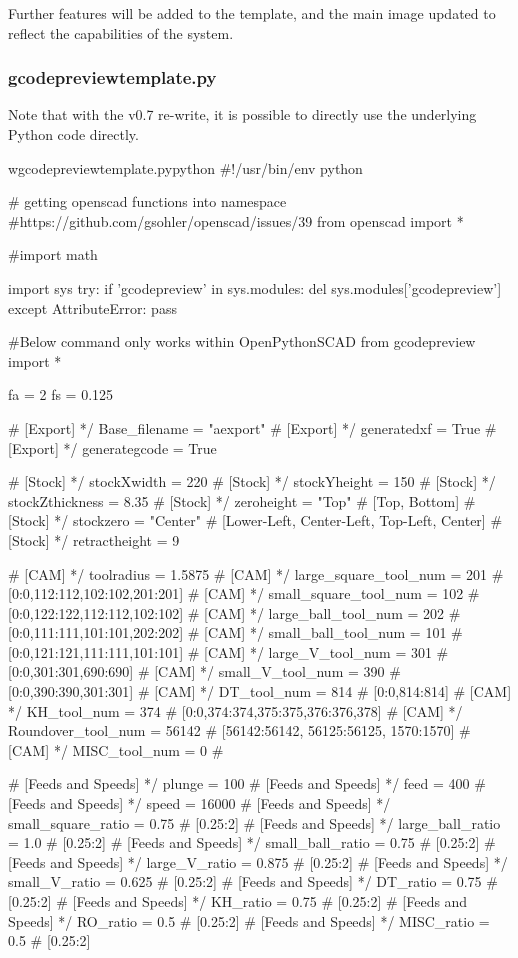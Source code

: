 \documentclass{ltxdoc}
\begin{document}
Further features will be added to the template, and the main image updated to reflect the capabilities of the system.


\subsubsection{gcodepreviewtemplate.py}
           
Note that with the v0.7 re-write, it is possible to directly use the underlying Python code directly.

\lstset{firstnumber=1}%
\begin{writecode}{w}{gcodepreviewtemplate.py}{python}
#!/usr/bin/env python

# getting openscad functions into namespace
#https://github.com/gsohler/openscad/issues/39
from openscad import *

#import math

import sys
try:
    if 'gcodepreview' in sys.modules:
        del sys.modules['gcodepreview']
except AttributeError:
    pass

#Below command only works within OpenPythonSCAD
from gcodepreview import *

fa = 2
fs = 0.125

# [Export] */
Base_filename = "aexport"
# [Export] */
generatedxf = True
# [Export] */
generategcode = True

# [Stock] */
stockXwidth = 220
# [Stock] */
stockYheight = 150
# [Stock] */
stockZthickness = 8.35
# [Stock] */
zeroheight = "Top" # [Top, Bottom]
# [Stock] */
stockzero = "Center" # [Lower-Left, Center-Left, Top-Left, Center]
# [Stock] */
retractheight = 9

# [CAM] */
toolradius = 1.5875
# [CAM] */
large_square_tool_num = 201 # [0:0,112:112,102:102,201:201]
# [CAM] */
small_square_tool_num = 102 # [0:0,122:122,112:112,102:102]
# [CAM] */
large_ball_tool_num = 202 # [0:0,111:111,101:101,202:202]
# [CAM] */
small_ball_tool_num = 101 # [0:0,121:121,111:111,101:101]
# [CAM] */
large_V_tool_num = 301 # [0:0,301:301,690:690]
# [CAM] */
small_V_tool_num = 390 # [0:0,390:390,301:301]
# [CAM] */
DT_tool_num = 814 # [0:0,814:814]
# [CAM] */
KH_tool_num = 374 # [0:0,374:374,375:375,376:376,378]
# [CAM] */
Roundover_tool_num = 56142 # [56142:56142, 56125:56125, 1570:1570]
# [CAM] */
MISC_tool_num = 0 #

# [Feeds and Speeds] */
plunge = 100
# [Feeds and Speeds] */
feed = 400
# [Feeds and Speeds] */
speed = 16000
# [Feeds and Speeds] */
small_square_ratio = 0.75 # [0.25:2]
# [Feeds and Speeds] */
large_ball_ratio = 1.0 # [0.25:2]
# [Feeds and Speeds] */
small_ball_ratio = 0.75 # [0.25:2]
# [Feeds and Speeds] */
large_V_ratio = 0.875 # [0.25:2]
# [Feeds and Speeds] */
small_V_ratio = 0.625 # [0.25:2]
# [Feeds and Speeds] */
DT_ratio = 0.75 # [0.25:2]
# [Feeds and Speeds] */
KH_ratio = 0.75 # [0.25:2]
# [Feeds and Speeds] */
RO_ratio = 0.5 # [0.25:2]
# [Feeds and Speeds] */
MISC_ratio = 0.5 # [0.25:2]


\end{writecode}
\end{document}
